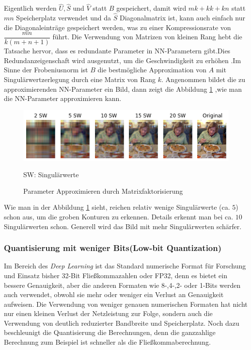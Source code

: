 \documentclass[12pt,a4paper]{scrartcl}
\numberwithin{equation}{section}
\begin{document}
Eigentlich werden $ \widehat{U} , \widehat{S} $ und $ \widehat{V} $ statt $ B $ gespeichert, damit wird $ m k + k k + k n $ statt $ mn $ Speicherplatz verwendet und da $ \widehat{S} $ Diagonalmatrix ist, kann auch einfach nur die Diagonaleinträge gespeichert werden, was zu einer Kompressionsrate von $ \dfrac{mn}{k(m+n+1)} $ führt. Die Verwendung von Matrizen von kleinen Rang hebt die Tatsache hervor, dass es redundante Parameter in \ac{NN}-Parametern gibt.Dies Redundanzeigenschaft wird ausgenutzt, um die Geschwindigkeit zu erhöhen \cite[Denton et al]{matrix quantization}.Im Sinne der Frobeniusnorm ist $ B $ die bestmögliche Approximation von $ A $ mit Singulärwertzerlegung durch eine Matrix von Rang $ k $.
Angenommen bildet die zu approximierenden NN-Parameter ein Bild, dann zeigt die Abbildung \ref{fig:matrix_fatorization} ,wie man die NN-Parameter approximieren kann.

\begin{figure}[h]
	\centering
	\includegraphics[width=\textwidth]{matrix_fatorization}
	\begin{center}
		SW: Singulärwerte
	\end{center}
	\caption{Parameter Approximieren durch Matrixfaktorisierung }
	\label{fig:matrix_fatorization}
\end{figure}
Wie man in der Abbildung \ref{fig:matrix_fatorization} sieht, reichen  relativ wenige Singulärwerte (ca. $ 5 $) schon aus, um die groben Konturen zu erkennen. Details erkennt man bei ca. $ 10 $ Singulärwerten schon. Generell wird das Bild mit mehr Singulärwerten schärfer.

\subsubsection{Quantisierung mit weniger Bits(Low-bit Quantization)}
Im Bereich des \textit{Deep Learning} ist das Standard numerische Format für Forschung und Einsatz bisher 32-Bit Fließkommazahlen oder FP32, denn es bietet ein bessere Genauigkeit, aber die anderen Formaten wie 8-,4-,2- oder 1-Bits werden auch verwendet, obwohl sie mehr oder weniger ein Verlust an Genauigkeit aufweisen.
Die Verwendung von weniger genauen numerischen Formaten hat nicht nur einen kleinen Verlust der Netzleistung zur Folge, sondern auch die Verwendung von deutlich reduzierter Bandbreite und Speicherplatz. Noch dazu beschleunigt die Quantisierung die Berechnungen, denn die ganzzahlige Berechnung zum Beispiel ist schneller als die Fließkommaberechnung.
\end{document}
